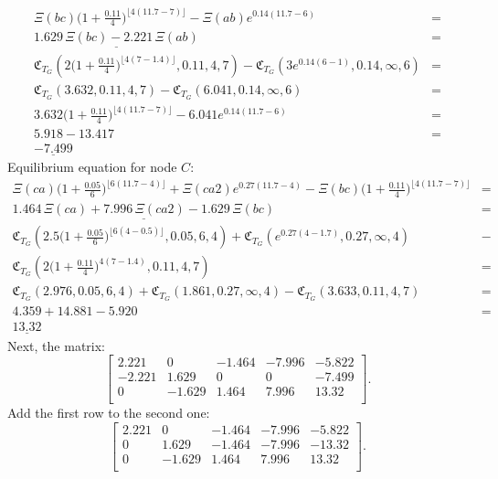 \documentclass[10pt]{article}
\newcommand{\CC}{\mathfrak{C}}
\begin{document}
\begin{align*}
\Xi(bc) \Big( 1 + \frac{0.11}{4} \Big)^{ \lfloor 4(11.7 - 7) \rfloor } - \Xi(ab) e^{0.14( 11.7 - 6 ) } &= \\
\underline{ 1.629 \, \Xi(bc) - 2.221 \, \Xi(ab) } &= \\
\CC_{T_G} (2 \Big( 1 + \frac{0.11}{4} \Big)^{ \lfloor 4(7 - 1.4) \rfloor }, 0.11, 4, 7 ) - \CC_{T_G} ( 3e^{0.14 ( 6 - 1 ) }, 0.14, \infty, 6 ) &= \\
\CC_{T_G} ( 3.632, 0.11, 4, 7 ) - \CC_{T_G} ( 6.041, 0.14, \infty, 6 ) &= \\ 
3.632 \Big( 1 + \frac{0.11}{4} \Big)^{\lfloor 4(11.7 - 7) \rfloor} - 6.041e^{0.14(11.7 - 6)} &= \\
5.918 - 13.417 &= \\
\underline{-7.499}
\end{align*}
Equilibrium equation for node $C$:
\begin{align*}
\Xi(ca) \Big( 1 + \frac{0.05}{6} \Big)^{ \lfloor 6 ( 11.7 - 4) \rfloor } + \Xi(ca2) e^{ 0.27(11.7 - 4) } - \Xi(bc) \Big( 1 + \frac{0.11}{4} \Big)^{ \lfloor 4 (11.7 - 7) \rfloor } &= \\
\underline{1.464 \, \Xi(ca) +7.996 \, \Xi(ca2) - 1.629 \, \Xi(bc)} &= \\
\CC_{T_G} ( 2.5 \Big( 1 + \frac{0.05}{6} \Big)^{ \lfloor 6 ( 4 - 0.5 ) \rfloor }, 0.05, 6, 4) + \CC_{T_G} ( e^{ 0.27 (4 - 1.7) }, 0.27, \infty, 4 ) &- \\
\CC_{T_G} ( 2 \Big( 1 + \frac{0.11}{4} \Big)^{ 4 (7 - 1.4) }, 0.11, 4, 7 ) &= \\
\CC_{T_G} (2.976, 0.05, 6, 4) + \CC_{T_G} ( 1.861, 0.27, \infty, 4 ) - \CC_{T_G} ( 3.633, 0.11, 4, 7 ) &= \\
4.359 + 14.881 - 5.920 &= \\
\underline{13.32}
\end{align*}
Next, the matrix:
\[
\begin{bmatrix}
2.221 & 0 & -1.464 & -7.996 & -5.822 \\
-2.221 & 1.629 & 0 & 0 & -7.499 \\
0 & -1.629 & 1.464 & 7.996 & 13.32 \\
\end{bmatrix}.
\]
Add the first row to the second one:
\[
\begin{bmatrix}
2.221 & 0 & -1.464 & -7.996 & -5.822 \\
0 & 1.629 & -1.464 & -7.996 & -13.32 \\
0 & -1.629 & 1.464 & 7.996 & 13.32 \\
\end{bmatrix}.
\]
\end{document}
